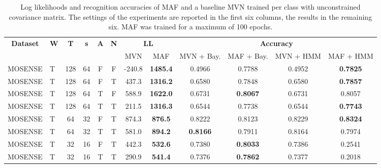 \documentclass[11pt,titlepage,oneside,openany]{book}
\begin{document}
\begin{table}[H]
	\centering
	\tiny
	\begin{tabular}{c l c c c c c c c c c c}
		\toprule
		\multirow{2}{*}{\bfseries Dataset} & 
		\multirow{2}{*}{\bfseries W} & 
		\multirow{2}{*}{\bfseries T} &
		\multirow{2}{*}{\bfseries s} &
		\multirow{2}{*}{\bfseries A} &
		\multirow{2}{*}{\bfseries N} &
		\multicolumn{2}{c}{\bfseries LL} & 
		\multicolumn{4}{c}{\bfseries Accuracy}\\
		\cmidrule(lr){7-8}
		\cmidrule(lr){9-12}
		& & & & & & MVN & MAF & MVN + Bay. & MAF + Bay. & MVN + HMM & MAF + HMM \\
		\cmidrule(lr){1-12}
		MOSENSE &    T &     128 &      64 &    F &  F & -240.8 & \textbf{1485.4} &   0.4966 &   0.7788 &   0.4952 &   \textbf{0.7825} \\
		MOSENSE &    T &     128 &      64 &    F &  T &  437.3 & \textbf{1316.2} &   0.6580 &   0.7848 &   0.6580 &   \textbf{0.7857} \\
		MOSENSE &    T &     128 &      64 &    T &  F &  588.9 & \textbf{1622.0} &   0.6731 &   \textbf{0.8067} &   0.6731 &   0.8057 \\
		MOSENSE &    T &     128 &      64 &    T &  T &  211.5 & \textbf{1316.3} &   0.6544 &   0.7738 &   0.6544 &   \textbf{0.7743} \\
		MOSENSE &    T &      64 &      32 &    F &  T &  874.3 &  \textbf{876.5} &   0.8222 &   0.8123 &   0.8229 &   \textbf{0.8324} \\
		MOSENSE &    T &      64 &      32 &    T &  T &  581.0 &  \textbf{894.2} &   \textbf{0.8166} &   0.7911 &   0.8164 &   0.7974 \\
		MOSENSE &    T &      32 &      16 &    F &  T &  442.3 &  \textbf{532.6} &   0.7380 &   \textbf{0.8033} &   0.7386 &   0.2541 \\
		MOSENSE &    T &      32 &      16 &    T &  T &  290.9 &  \textbf{541.4} &   0.7376 &   \textbf{0.7862} &   0.7377 &   0.2018 \\
		\bottomrule
	\end{tabular}
	\caption[Evaluation Results MotionSense, Long]{\label{tab:mos} Log likelihoods and recognition accuracies of MAF and a baseline MVN trained per class with unconstrained covariance matrix. The settings of the experiments are reported in the first six columns, the results in the remaining six. MAF was trained for a maximum of 100 epochs.}
\end{table}
\end{document}
